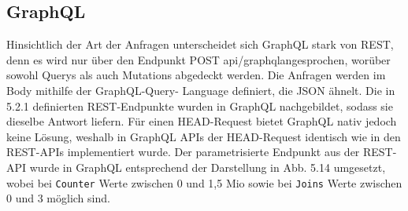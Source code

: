 \newpage
\subsection{GraphQL}
Hinsichtlich der Art der Anfragen unterscheidet sich GraphQL stark von REST, denn es wird nur über den Endpunkt \colorbox{gray!20}{POST api/graphql}angesprochen, worüber sowohl Querys als auch Mutations abgedeckt werden. Die Anfragen werden im Body mithilfe der GraphQL-Query- Language definiert, die JSON ähnelt. Die in 5.2.1 definierten REST-Endpunkte wurden in GraphQL nachgebildet, sodass sie dieselbe Antwort liefern. Für einen HEAD-Request bietet GraphQL nativ jedoch keine Lösung, weshalb in GraphQL APIs der HEAD-Request identisch wie in den REST-APIs implementiert wurde. Der parametrisierte Endpunkt aus der REST-API wurde in GraphQL entsprechend der Darstellung in Abb. 5.14 umgesetzt, wobei bei \texttt{Counter} Werte zwischen 0 und 1,5 Mio sowie bei  \texttt{Joins} Werte zwischen 0 und 3 möglich sind.

